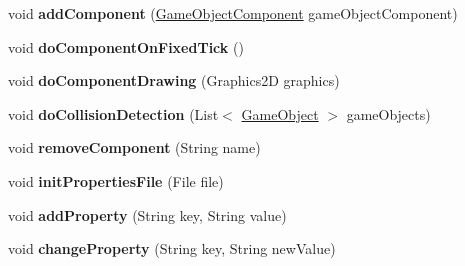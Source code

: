 \begin{DoxyCompactItemize}
void {\bfseries add\+Component} (\mbox{\hyperlink{classde_1_1me_1_1edgelord_1_1sjgl_1_1gameobject_1_1_game_object_component}{Game\+Object\+Component}} game\+Object\+Component)
\item 
\mbox{\label{classde_1_1me_1_1edgelord_1_1sjgl_1_1gameobject_1_1_game_object_aa8feb580a59bd809dd59ccf535ae2dc2}} 
void {\bfseries do\+Component\+On\+Fixed\+Tick} ()
\item 
\mbox{\label{classde_1_1me_1_1edgelord_1_1sjgl_1_1gameobject_1_1_game_object_a3e6aeef784849a7af87891f8d1a8456a}} 
void {\bfseries do\+Component\+Drawing} (Graphics2D graphics)
\item 
\mbox{\label{classde_1_1me_1_1edgelord_1_1sjgl_1_1gameobject_1_1_game_object_a8a4bba6bae72ce4258065457b173b8ed}} 
void {\bfseries do\+Collision\+Detection} (List$<$ \mbox{\hyperlink{classde_1_1me_1_1edgelord_1_1sjgl_1_1gameobject_1_1_game_object}{Game\+Object}} $>$ game\+Objects)
\item 
\mbox{\label{classde_1_1me_1_1edgelord_1_1sjgl_1_1gameobject_1_1_game_object_a1d7c8c571a5d3eecf47bac2bb042829e}} 
void {\bfseries remove\+Component} (String name)
\item 
\mbox{\label{classde_1_1me_1_1edgelord_1_1sjgl_1_1gameobject_1_1_game_object_a918d929152aa4344b32d6ad47afd764d}} 
void {\bfseries init\+Properties\+File} (File file)
\item 
\mbox{\label{classde_1_1me_1_1edgelord_1_1sjgl_1_1gameobject_1_1_game_object_a61b0d6ebf7446865f0d94b46025d4117}} 
void {\bfseries add\+Property} (String key, String value)
\item 
\mbox{\label{classde_1_1me_1_1edgelord_1_1sjgl_1_1gameobject_1_1_game_object_af1d74ef479c70ea4a855380bfef522cb}} 
void {\bfseries change\+Property} (String key, String new\+Value)
\item 

\end{DoxyCompactItemize}
